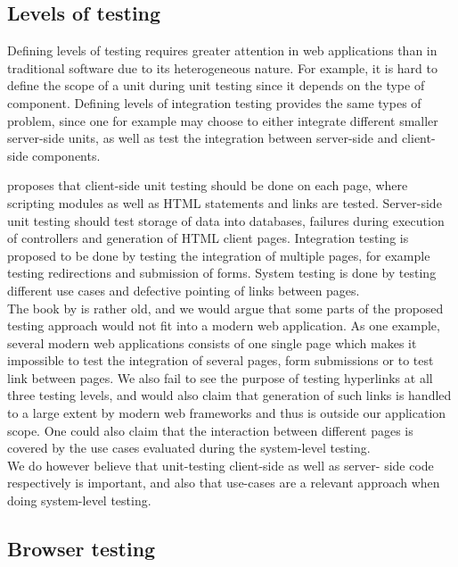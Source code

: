 \subsection{Levels of testing}

Defining levels of testing requires greater attention in web
applications than in traditional software due to its heterogeneous
nature. For example, it is hard to define the scope of a unit during
unit testing since it depends on the type of component. Defining levels
of integration testing provides the same types of problem, since one for
example may choose to either integrate different smaller server-side
units, as well as test the integration between server-side and client-
side components.\cite{book:web}

\citeauthor{book:web} proposes that client-side unit testing should be
done on each page, where scripting modules as well as HTML statements
and links are tested. Server-side unit testing should test storage of
data into databases, failures during execution of controllers and
generation of HTML client pages. Integration testing is proposed to be
done by testing the integration of multiple pages, for example testing
redirections and submission of forms. System testing is done by testing
different use cases and defective pointing of links between pages.\\

The book by \citeauthor{book:web} is rather old, and we would argue that
some parts of the proposed testing approach would not fit into a modern
web application. As one example, several modern web applications
consists of one single page which makes it impossible to test the
integration of several pages, form submissions or to test link between
pages. We also fail to see the purpose of testing hyperlinks at all
three testing levels, and would also claim that generation of such links
is handled to a large extent by modern web frameworks and thus is
outside our application scope. One could also claim that the interaction
between different pages is covered by the use cases evaluated during
the system-level testing.\\

We do however believe that unit-testing client-side as well as server-
side code respectively is important, and also that use-cases are a
relevant approach when doing system-level testing.\\


\subsection{Browser testing}

